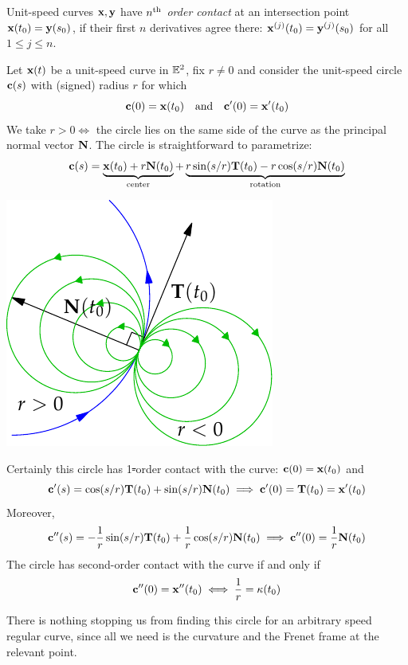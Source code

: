 \begin{defn}{}{}
	Unit-speed curves ${\mathbf{x}},{\mathbf{y}}$ have \emph{$n\textsuperscript{th}$ order contact} at an intersection point ${\mathbf{x}}(t_0)={\mathbf{y}}(s_0)$, if their first $n$ derivatives agree there: ${\mathbf{x}}^{(j)}(t_0)={\mathbf{y}}^{(j)}(s_0)$ for all $1\le j\le n$.
\end{defn}

\begin{minipage}[t]{0.65\linewidth}\vspace{0pt}
	Let ${\mathbf{x}}(t)$ be a unit-speed curve in $\mathbb{E}^2$, fix $r\neq 0$ and consider the unit-speed circle ${\mathbf{c}}(s)$ with (signed) radius $r$ for which
	\[
		{\mathbf{c}}(0)={\mathbf{x}}(t_0) \quad\text{and}\quad {\mathbf{c}}'(0)={\mathbf{x}}'(t_0)
	\]
	We take $r>0\iff$ the circle lies on the same side of the curve as the principal normal vector ${\mathbf{N}}$.\medbreak
	The circle is straightforward to parametrize:
	\[
		{\mathbf{c}}(s)=\underbrace{{\mathbf{x}}(t_0)+r{\mathbf{N}}(t_0)}_{\text{center}} +\underbrace{r\sin(s/r){\mathbf{T}}(t_0)-r\cos(s/r){\mathbf{N}}(t_0)}_{\text{rotation}}
		\]
\end{minipage}
\hfill
\begin{minipage}[t]{0.34\linewidth}\vspace{0pt}
	\flushright\includegraphics[scale=0.9]{radii-circles}
\end{minipage}\medbreak
Certainly this circle has 1\st-order contact with the curve: ${\mathbf{c}}(0)={\mathbf{x}}(t_0)$ and 
\[
	{\mathbf{c}}'(s)=\cos(s/r){\mathbf{T}}(t_0)+\sin(s/r){\mathbf{N}}(t_0)\implies {\mathbf{c}}'(0)={\mathbf{T}}(t_0)={\mathbf{x}}'(t_0)
\]
Moreover,
\[
	{\mathbf{c}}''(s)=-\frac 1r\sin(s/r){\mathbf{T}}(t_0)+\frac 1r\cos(s/r){\mathbf{N}}(t_0)\implies {\mathbf{c}}''(0)=\frac 1r{\mathbf{N}}(t_0)
\]
The circle has second-order contact with the curve if and only if
\[
	{\mathbf{c}}''(0)={\mathbf{x}}''(t_0)\iff \frac 1r=\kappa(t_0)
\]

There is nothing stopping us from finding this circle for an arbitrary speed regular curve, since all we need is the curvature and the Frenet frame at the relevant point.

